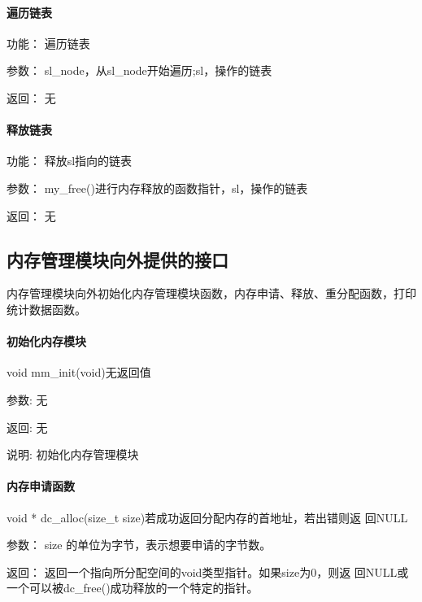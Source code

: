 \paragraph{遍历链表}
	\begin{compactdesc}
	\item[功能：]遍历链表
	\item[参数：]sl\_node，从sl\_node开始遍历;sl，操作的链表
	\item[返回：]无
	\end{compactdesc}
\paragraph{ 释放链表}
	\begin{compactdesc}
	\item[功能：]释放sl指向的链表
	\item[参数：]my\_free()进行内存释放的函数指针，sl，操作的链表
	\item[返回：]无
	\end{compactdesc}


\subsection{内存管理模块向外提供的接口}
内存管理模块向外初始化内存管理模块函数，内存申请、释放、重分配函数，打印
统计数据函数。
\paragraph{初始化内存模块}
{void mm\_init(void)}{无返回值}
	\begin{compactdesc}
	\item[参数:]无
	\item[返回:]无
	\item[说明:]初始化内存管理模块
	\end{compactdesc}

\paragraph{内存申请函数}
	{void * dc\_alloc(size\_t size)}{若成功返回分配内存的首地址，若出错则返
	回NULL}
	\begin{compactdesc}
	\item[参数：]size 的单位为字节，表示想要申请的字节数。
	\item[返回：]返回一个指向所分配空间的void类型指针。如果size为0，则返
	回NULL或一个可以被dc\_free()成功释放的一个特定的指针。
	\end{compactdesc}
